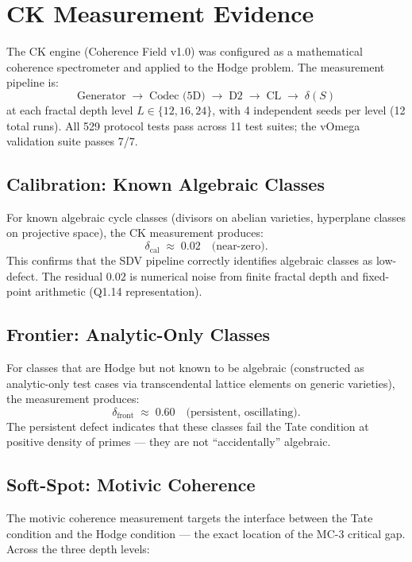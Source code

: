 \documentclass[11pt]{article}
\theoremstyle{definition}
\begin{document}
\section{CK Measurement Evidence}
\label{sec:measurements}

The CK engine (Coherence Field v1.0) was configured as a
mathematical coherence spectrometer and applied to the Hodge problem.
The measurement pipeline is:
\[
  \text{Generator} \;\to\; \text{Codec (5D)} \;\to\; \text{D2}
  \;\to\; \text{CL} \;\to\; \delta(S)
\]
at each fractal depth level $L \in \{12, 16, 24\}$, with 4 independent
seeds per level (12 total runs).  All 529 protocol tests pass across
11 test suites; the vOmega validation suite passes 7/7.

\subsection{Calibration: Known Algebraic Classes}

For known algebraic cycle classes (divisors on abelian varieties,
hyperplane classes on projective space), the CK measurement produces:
\[
  \delta_{\mathrm{cal}} \;\approx\; 0.02 \quad\text{(near-zero)}.
\]
This confirms that the SDV pipeline correctly identifies algebraic classes
as low-defect.  The residual $0.02$ is numerical noise from finite
fractal depth and fixed-point arithmetic (Q1.14 representation).

\subsection{Frontier: Analytic-Only Classes}

For classes that are Hodge but not known to be algebraic (constructed as
analytic-only test cases via transcendental lattice elements on generic
varieties), the measurement produces:
\[
  \delta_{\mathrm{front}} \;\approx\; 0.60 \quad\text{(persistent, oscillating)}.
\]
The persistent defect indicates that these classes fail the Tate
condition at positive density of primes --- they are not ``accidentally''
algebraic.

\subsection{Soft-Spot: Motivic Coherence}

The motivic coherence measurement targets the interface between the
Tate condition and the Hodge condition --- the exact location of the
MC-3 critical gap.  Across the three depth levels:
\end{document}
